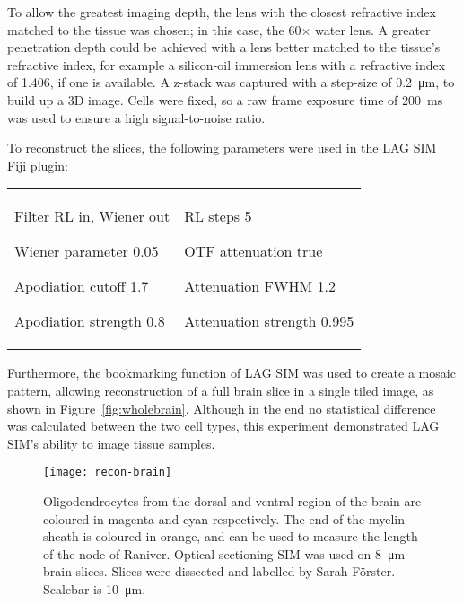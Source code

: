 To allow the greatest imaging depth, the lens with the closest refractive index matched to the tissue was chosen; in this case, the 60$\times$ water lens. 
A greater penetration depth could be achieved with a lens better matched to the tissue's refractive index, for example a silicon-oil immersion lens with a refractive index of \num{1.406}, if one is available. 
A z-stack was captured with a step-size of \SI{0.2}{\micro\metre}, to build up a 3D image. 
Cells were fixed, so a raw frame exposure time of \SI{200}{\milli\second} was used to ensure a high signal-to-noise ratio. 

To reconstruct the slices, the following parameters were used in the LAG SIM Fiji plugin:\newline
\begin{tabular}{p{}p{}}
\begin{labelling}[margin={Attenuation strength}]
	\item[Filter] RL in, Wiener out
	\item[Wiener parameter] 0.05
	\item[Apodiation cutoff] 1.7
	\item[Apodiation strength] 0.8
\end{labelling} &
\begin{labelling}[margin={Attenuation strength}]
	\item[RL steps] 5
	\item[OTF attenuation] true
	\item[Attenuation FWHM] 1.2
	\item[Attenuation strength] 0.995 
\end{labelling} %
\end{tabular}

Furthermore, the bookmarking function of LAG SIM was used to create a mosaic pattern, allowing reconstruction of a full brain slice in a single tiled image, as shown in Figure~\ref{fig:wholebrain}. 
Although in the end no statistical difference was calculated between the two cell types, this experiment demonstrated LAG SIM's ability to image tissue samples. 

\begin{figure}[tbp!]
\centering
\texttt{[image: recon-brain]}
\caption[LAG SIM: Multi-colour optical sectioning SIM to measure the node of Raniver]{Oligodendrocytes from the dorsal and ventral region of the brain are coloured in magenta and cyan respectively. The end of the myelin sheath is coloured in orange, and can be used to measure the length of the node of Raniver. Optical sectioning SIM was used on \SI{8}{\micro\metre} brain slices. Slices were dissected and labelled by Sarah F{\"o}rster. Scalebar is \SI{10}{\micro\metre}. }
\label{fig:recon-brain}
\end{figure}

